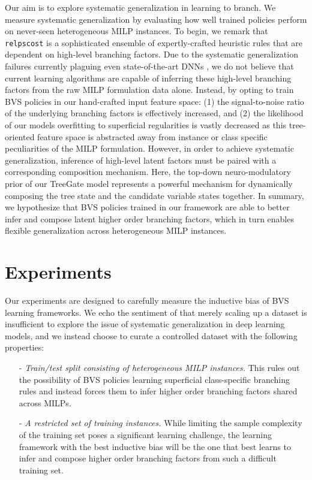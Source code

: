 \documentclass[letterpaper]{article} %
\begin{document}
Our aim is to explore systematic generalization in learning to branch.
We measure systematic generalization by evaluating how well trained policies perform on never-seen heterogeneous MILP instances.
To begin, we remark that \texttt{relpscost} is a sophisticated ensemble of expertly-crafted heuristic rules that are dependent on high-level branching factors.
Due to the systematic generalization failures currently plaguing even state-of-the-art DNNs \cite{LakeSystematic, CLEVRCOGENT, GoodfellowAdvExs}, we do not believe that current learning algorithms are capable of inferring these high-level branching factors from the raw MILP formulation data alone.
Instead, by opting to train BVS policies in our hand-crafted input feature space: (1) the signal-to-noise ratio of the underlying branching factors is effectively increased, and (2) the likelihood of our models overfitting to superficial regularities is vastly decreased as this tree-oriented feature space is abstracted away from instance or class specific peculiarities of the MILP formulation.
However, in order to achieve systematic generalization, inference of high-level latent factors must be paired with a corresponding composition mechanism.
Here, the top-down neuro-modulatory prior of our TreeGate model represents a powerful mechanism for dynamically composing the tree state and the candidate variable states together.
In summary, we hypothesize that BVS policies trained in our framework are able to better infer and compose latent higher order branching factors, which in turn enables flexible generalization across heterogeneous MILP instances.

\section{Experiments}
\label{sec:experiments}

Our experiments are designed to carefully measure the inductive bias of BVS learning frameworks.
We echo the sentiment of \citeauthor{MogrifierLSTM} that merely scaling up a dataset is insufficient to explore the issue of systematic generalization in deep learning models, and we instead choose to curate a controlled dataset with the following properties:
\begin{itemize}
    \item[-] \emph{Train/test split consisting of heterogeneous MILP instances.}
    This rules out the possibility of BVS policies learning superficial class-specific branching rules and instead forces them to infer higher order branching factors shared across MILPs.

    \item[-] \emph{A restricted set of training instances.}
    While limiting the sample complexity of the training set poses a significant learning challenge, the learning framework with the best inductive bias will be the one that best learns to infer and compose higher order branching factors from such a difficult training set.
\end{itemize}
\end{document}
